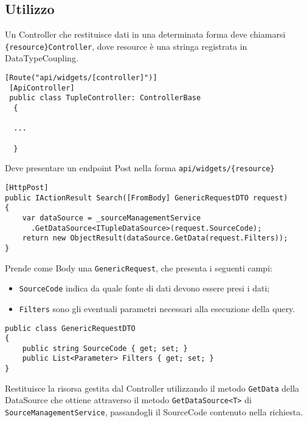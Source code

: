 \subsection{Utilizzo}
Un Controller che restituisce dati in una determinata forma deve chiamarsi \verb|{resource}Controller|, dove resource è una stringa registrata in DataTypeCoupling.
\begin{lstlisting}[caption={TupleController.cs}, style=sharpCode]
 [Route("api/widgets/[controller]")]
 [ApiController]
 public class TupleController: ControllerBase
  {
  
  ...
  
  }
\end{lstlisting}
Deve presentare un endpoint Post nella forma \verb|api/widgets/{resource}|
\begin{lstlisting}[caption={TupleController.cs}, style=sharpCode]
[HttpPost]
public IActionResult Search([FromBody] GenericRequestDTO request)
{
    var dataSource = _sourceManagementService
      .GetDataSource<ITupleDataSource>(request.SourceCode);
    return new ObjectResult(dataSource.GetData(request.Filters));
}
\end{lstlisting}
Prende come Body una \verb|GenericRequest|, che presenta i seguenti campi:
\begin{itemize}
\item \verb|SourceCode| indica da quale fonte di dati devono essere presi i dati;
\item \verb|Filters| sono gli eventuali parametri necessari alla esecuzione della query.
\end{itemize}
\begin{lstlisting}[caption={GenericRequestDTO.cs}, style=sharpCode]
public class GenericRequestDTO
{
    public string SourceCode { get; set; }
    public List<Parameter> Filters { get; set; }
}
\end{lstlisting}
Restituisce la risorsa gestita dal Controller utilizzando il metodo \verb|GetData| della DataSource che ottiene attraverso il metodo \verb|GetDataSource<T>| di \verb|SourceManagementService|, passandogli il SourceCode contenuto nella richiesta.